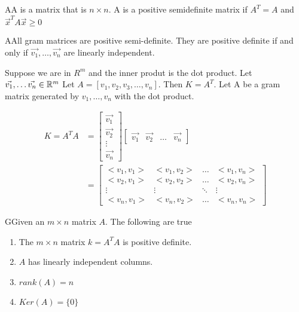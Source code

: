   \begin{definition}
    AA is a matrix that is $n\times n$. A is a positive semidefinite matrix if $A^{T}=A$ and $\vec{x}^{T}A\vec{x}\ge 0$
  \end{definition}

  \begin{theorem}
    AAll gram matrices are positive semi-definite. They are positive definite if and only if $\vec{v_1},\ldots,\vec{v_n}$ are linearly independent.
  \end{theorem}

  Suppose we are in $R^{m}$ and the inner produt is the dot product. Let $\vec{v_1},\ldots \vec{v_n}\in\mathbb{R}^{m}$\newline
  Let $A=[v_1,v_2,v_3,\ldots,v_n]$. Then $K=A^{T}$. Let A be a gram matrix generated by $v_1,\ldots,v_n$ with the dot product.

  \begin{align}
    K=A^{T}A&=\begin{bmatrix} \vec{v_1}\\\vec{v_2}\\ \vdots\\\vec{v_n} \end{bmatrix}
    \begin{bmatrix} \vec{v_1}&\vec{v_2}&\ldots&\vec{v_n} \end{bmatrix} \\
                             &=
    \begin{bmatrix} 
      <v_1,v_1>&<v_1,v_2>&\ldots&<v_1,v_n>\\
      <v_2,v_1>&<v_2,v_2>&\ldots&<v_2,v_n>\\
      \vdots&\vdots&\ddots&\vdots\\
      <v_n,v_1>&<v_n,v_2>&\ldots&<v_n,v_n>
    \end{bmatrix} 
  \end{align}

  \begin{proposition}
    GGiven an $m\times n$ matrix $A$. The following are true
    \begin{enumerate}
      \item The $m\times n$ matrix $k=A^{T}A$ is positive definite.
      \item $A$ has linearly independent columns.
      \item $rank (A)=n$
      \item $Ker(A)=\{0\}$
    \end{enumerate}
  \end{proposition}

